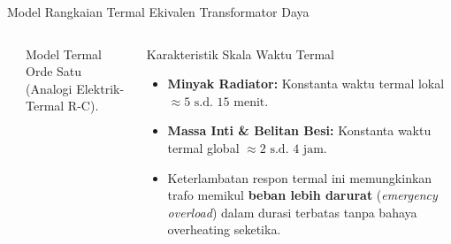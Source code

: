 \documentclass[aspectratio=169,10pt]{beamer}
\begin{document}
\begin{frame}{Model Rangkaian Termal Ekivalen Transformator Daya}
  \begin{columns}
    \begin{center}
    \end{center}
    \vspace{-0.2cm}
    \begin{center}
      \footnotesize Model Termal Orde Satu (Analogi Elektrik-Termal R-C).
    \end{center}

    \begin{block}{Karakteristik Skala Waktu Termal}
      \begin{itemize}
        \item \textbf{Minyak Radiator:} Konstanta waktu termal lokal $\approx 5\text{ s.d. } 15\text{ menit}$.
        \item \textbf{Massa Inti \& Belitan Besi:} Konstanta waktu termal global $\approx 2\text{ s.d. } 4\text{ jam}$.
        \item Keterlambatan respon termal ini memungkinkan trafo memikul \textbf{beban lebih darurat} (\textit{emergency overload}) dalam durasi terbatas tanpa bahaya overheating seketika.
      \end{itemize}
    \end{block}
  \end{columns}
\end{frame}
\end{document}

